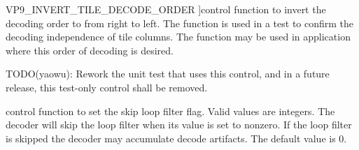 \begin{Desc}
\begin{description}
{V\+P9\+\_\+\+I\+N\+V\+E\+R\+T\+\_\+\+T\+I\+L\+E\+\_\+\+D\+E\+C\+O\+D\+E\+\_\+\+O\+R\+D\+ER\hypertarget{group__vp8__decoder_ggaf9dd3f2e6d1412106ee791af768e57c1a1c4fc468749a2ef88e148f09210ce73c}{}\label{group__vp8__decoder_ggaf9dd3f2e6d1412106ee791af768e57c1a1c4fc468749a2ef88e148f09210ce73c}
}]control function to invert the decoding order to from right to left. The function is used in a test to confirm the decoding independence of tile columns. The function may be used in application where this order of decoding is desired.

T\+O\+D\+O(yaowu)\+: Rework the unit test that uses this control, and in a future release, this test-\/only control shall be removed. \item[{\em 
V\+P9\+\_\+\+S\+E\+T\+\_\+\+S\+K\+I\+P\+\_\+\+L\+O\+O\+P\+\_\+\+F\+I\+L\+T\+ER\hypertarget{group__vp8__decoder_ggaf9dd3f2e6d1412106ee791af768e57c1a999ed127a9ddb4be322a5a93eaed1233}{}\label{group__vp8__decoder_ggaf9dd3f2e6d1412106ee791af768e57c1a999ed127a9ddb4be322a5a93eaed1233}
}]control function to set the skip loop filter flag. Valid values are integers. The decoder will skip the loop filter when its value is set to nonzero. If the loop filter is skipped the decoder may accumulate decode artifacts. The default value is 0. \end{description}
\end{Desc}
